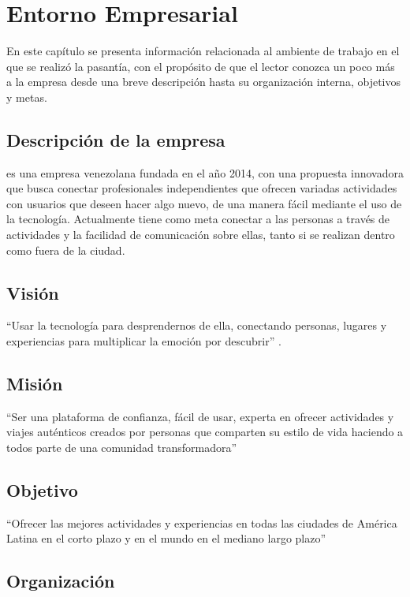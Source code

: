 \chapter{Entorno Empresarial}

En este capítulo se presenta información relacionada al ambiente de trabajo en el que se realizó la pasantía, con el propósito de que el lector conozca un poco más a la empresa \business desde una breve descripción hasta su organización interna, objetivos y metas.

\section{Descripción de la empresa}

\business es una empresa venezolana fundada en el año 2014, con una propuesta innovadora que busca conectar profesionales independientes que ofrecen variadas actividades con usuarios que deseen hacer algo nuevo, de una manera fácil mediante el uso de la tecnología. Actualmente tiene como meta conectar a las personas a través de actividades y la facilidad de comunicación sobre ellas, tanto si se realizan dentro como fuera de la ciudad.

\section{Visión}

``Usar la tecnología para desprendernos de ella, conectando personas, lugares y experiencias para multiplicar la emoción por descubrir'' \cite{zomoz}.

\section{Misión}

``Ser una plataforma de confianza, fácil de usar, experta en ofrecer actividades y viajes auténticos creados por personas que comparten su estilo de vida haciendo a todos parte de una comunidad transformadora'' \cite{zomoz}

\section{Objetivo}

``Ofrecer las mejores actividades y experiencias en todas las ciudades de América Latina en el corto plazo y en el mundo en el mediano largo plazo'' \cite{zomoz}

\section{Organización}

